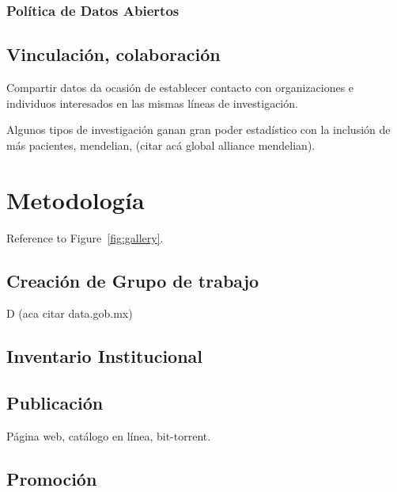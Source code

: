 \documentclass[
10pt, %
letterpaper, %
oneside, %
headinclude,footinclude, %
BCOR5mm, %
]{scrartcl}
\begin{document}
\subsubsection{Política de Datos Abiertos}


\subsection{Vinculación, colaboración}
Compartir datos da ocasión de establecer contacto con organizaciones e
individuos interesados en las mismas líneas de investigación.

Algunos tipos de investigación ganan gran poder estadístico con la
inclusión de más pacientes, mendelian, (citar acá global alliance
mendelian). 


\section{Metodología}
Reference to Figure~\vref{fig:gallery}. %



\subsection{Creación de Grupo de trabajo}
D
(aca citar data.gob.mx)

\subsection{Inventario Institucional}
\cite{_nih_????}

\subsection{Publicación}
Página web, catálogo en línea, bit-torrent.

\subsection{Promoción}
\cite{schofield_post-publication_2009}
\end{document}
